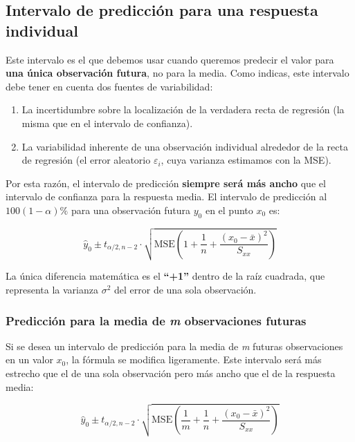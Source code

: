 \documentclass[
  letterpaper,
  DIV=11,
  numbers=noendperiod]{scrreprt}
\providecommand{\tightlist}{%
  \setlength{\itemsep}{0pt}\setlength{\parskip}{0pt}}
\begin{document}
\subsection{Intervalo de predicción para una respuesta
individual}\label{intervalo-de-predicciuxf3n-para-una-respuesta-individual}

Este intervalo es el que debemos usar cuando queremos predecir el valor
para \textbf{una única observación futura}, no para la media. Como
indicas, este intervalo debe tener en cuenta dos fuentes de
variabilidad:

\begin{enumerate}
\def\labelenumi{\arabic{enumi}.}
\tightlist
\item
  La incertidumbre sobre la localización de la verdadera recta de
  regresión (la misma que en el intervalo de confianza).
\item
  La variabilidad inherente de una observación individual alrededor de
  la recta de regresión (el error aleatorio \(\varepsilon_i\), cuya
  varianza estimamos con la MSE).
\end{enumerate}

Por esta razón, el intervalo de predicción \textbf{siempre será más
ancho} que el intervalo de confianza para la respuesta media. El
intervalo de predicción al \(100(1-\alpha)\%\) para una observación
futura \(y_0\) en el punto \(x_0\) es:

\[
\hat{y}_0 \pm t_{\alpha/2, n-2} \cdot \sqrt{\text{MSE} \left( 1 + \frac{1}{n} + \frac{(x_0 - \bar{x})^2}{S_{xx}} \right)}
\]

La única diferencia matemática es el \textbf{``+1''} dentro de la raíz
cuadrada, que representa la varianza \(\sigma^2\) del error de una sola
observación.

\subsubsection{\texorpdfstring{Predicción para la media de \emph{m}
observaciones
futuras}{Predicción para la media de m observaciones futuras}}\label{predicciuxf3n-para-la-media-de-m-observaciones-futuras}

Si se desea un intervalo de predicción para la media de \emph{m} futuras
observaciones en un valor \(x_0\), la fórmula se modifica ligeramente.
Este intervalo será más estrecho que el de una sola observación pero más
ancho que el de la respuesta media:

\[
\hat{y}_0 \pm t_{\alpha/2, n-2} \cdot \sqrt{\text{MSE} \left( \frac{1}{m} + \frac{1}{n} + \frac{(x_0 - \bar{x})^2}{S_{xx}} \right)}
\]
\end{document}
